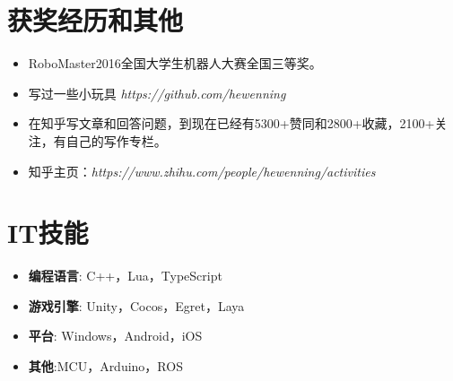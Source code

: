 \documentclass{resume}
\begin{document}
\section{获奖经历和其他}
\begin{itemize}[parsep=0.2ex]
  \item RoboMaster2016全国大学生机器人大赛全国三等奖。
  \item 写过一些小玩具 \textit{https://github.com/hewenning}
  \item 在知乎写文章和回答问题，到现在已经有5300+赞同和2800+收藏，2100+关注，有自己的写作专栏。
  \item 知乎主页：\textit{https://www.zhihu.com/people/hewenning/activities}
\end{itemize}

\section{IT技能}
\begin{itemize}[parsep=0.2ex]
	\item \textbf{编程语言}: C++，Lua，TypeScript
	\item \textbf{游戏引擎}: Unity，Cocos，Egret，Laya
	\item \textbf{平台}: Windows，Android，iOS
	\item \textbf{其他}:MCU，Arduino，ROS
\end{itemize}
\end{document}
